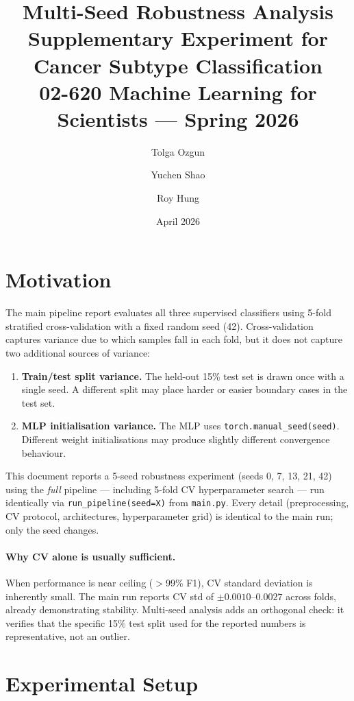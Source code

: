 \documentclass[11pt,letterpaper]{article}
\title{%
  \Large\textbf{Multi-Seed Robustness Analysis}\\[4pt]
  \large Supplementary Experiment for Cancer Subtype Classification\\[4pt]
  \normalsize 02-620 Machine Learning for Scientists --- Spring 2026
}
\author{Tolga Ozgun \and Yuchen Shao \and Roy Hung}
\date{April 2026}
\begin{document}
\maketitle

\section{Motivation}

The main pipeline report evaluates all three supervised classifiers using
5-fold stratified cross-validation with a fixed random seed (42).
Cross-validation captures variance due to which samples fall in each fold,
but it does not capture two additional sources of variance:

\begin{enumerate}[leftmargin=2em,itemsep=2pt]
  \item \textbf{Train/test split variance.}  The held-out 15\% test set is
        drawn once with a single seed.  A different split may place harder or
        easier boundary cases in the test set.
  \item \textbf{MLP initialisation variance.}  The MLP uses
        \texttt{torch.manual\_seed(seed)}.  Different weight initialisations
        may produce slightly different convergence behaviour.
\end{enumerate}

This document reports a 5-seed robustness experiment (seeds 0, 7, 13, 21, 42)
using the \emph{full} pipeline --- including 5-fold CV hyperparameter search
--- run identically via \texttt{run\_pipeline(seed=X)} from \texttt{main.py}.
Every detail (preprocessing, CV protocol, architectures, hyperparameter grid)
is identical to the main run; only the seed changes.

\paragraph{Why CV alone is usually sufficient.}
When performance is near ceiling ($>$99\% F1), CV standard deviation is
inherently small.  The main run reports CV std of $\pm 0.0010$--$0.0027$
across folds, already demonstrating stability.  Multi-seed analysis adds an
orthogonal check: it verifies that the specific 15\% test split used for the
reported numbers is representative, not an outlier.

\section{Experimental Setup}
\end{document}
